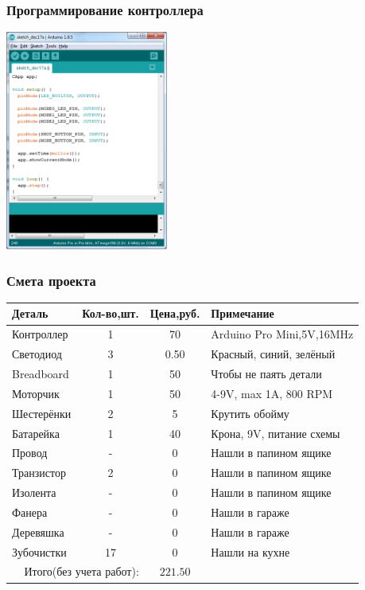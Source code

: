 \begin{frame}
    \frametitle{Программирование контроллера \myDevice}
    
    \begin{center}
        \includegraphics[width=0.4\textwidth]{fig/programming}
    \end{center}
\end{frame}

\begin{frame}
    \frametitle{Смета проекта \myDevice}
    
    \begin{center}
        \begin{tabular}{l|c|c|l}
            \hline\hline
            Деталь & Кол-во,шт. & Цена,руб. & Примечание \\
            \hline\hline
            Контроллер & 1  & 70   & Arduino Pro Mini,5V,16MHz\\
            Светодиод  & 3  & 0.50 & Красный, синий, зелёный\\
            Breadboard & 1  & 50   & Чтобы не паять детали\\
            Моторчик   & 1  & 50   & 4-9V, max 1A, 800 RPM\\
            Шестерёнки & 2  & 5    & Крутить обойму\\
            Батарейка  & 1  & 40   & Крона, 9V, питание схемы\\
            Провод     & -  & 0    & Нашли в папином ящике\\
            Транзистор & 2  & 0    & Нашли в папином ящике\\
            Изолента   & -  & 0    & Нашли в папином ящике\\
            Фанера     & -  & 0    & Нашли в гараже\\
            Деревяшка  & -  & 0    & Нашли в гараже\\
            Зубочистки & 17 & 0    & Нашли на кухне\\ \hline
            \multicolumn{2}{r|}{Итого(\alert{без учета работ}):} & \multicolumn{1}{c}{\alert{$221.50$}} & \\
        \end{tabular}
    \end{center}
\end{frame}


